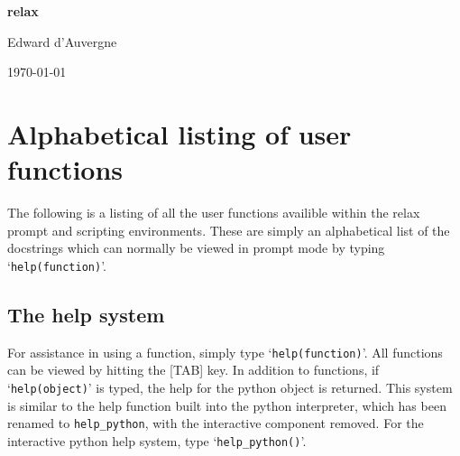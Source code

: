 \documentclass[a4paper, 11pt, twoside]{book}
\begin{document}

\begin{titlepage}
\begin{center}


{\huge \textbf{relax}}


{\Large Edward d'Auvergne}


{\large \today}


\end{center}
\end{titlepage}



\tableofcontents




\chapter{Alphabetical listing of user functions}

The following is a listing of all the user functions availible within the relax prompt and scripting environments.  These are simply an alphabetical list of the docstrings which can normally be viewed in prompt mode by typing `\texttt{help(function)}'.


\section{The help system}

For assistance in using a function, simply type `\texttt{help(function)}'.  All functions can be viewed by hitting the [TAB] key.  In addition to functions, if `\texttt{help(object)}' is typed, the help for the python object is returned.  This system is similar to the help function built into the python interpreter, which has been renamed to \texttt{help\_python}, with the interactive component removed.  For the interactive python help system, type `\texttt{help\_python()}'.
\end{document}
